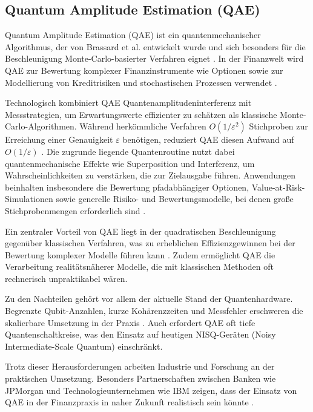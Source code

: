 \subsection{Quantum Amplitude Estimation (QAE)}

Quantum Amplitude Estimation (QAE) ist ein quantenmechanischer Algorithmus, der von Brassard et al. entwickelt wurde und sich besonders für die Beschleunigung Monte-Carlo-basierter Verfahren eignet \cite{quantumjournal2020}. In der Finanzwelt wird QAE zur Bewertung komplexer Finanzinstrumente wie Optionen sowie zur Modellierung von Kreditrisiken und stochastischen Prozessen verwendet \cite{rebentrost2018, egger2020}.

Technologisch kombiniert QAE Quantenamplitudeninterferenz mit Messstrategien, um Erwartungswerte effizienter zu schätzen als klassische Monte-Carlo-Algorithmen. Während herkömmliche Verfahren $O(1/\varepsilon^2)$ Stichproben zur Erreichung einer Genauigkeit $\varepsilon$ benötigen, reduziert QAE diesen Aufwand auf $O(1/\varepsilon)$ \cite{quantumjournal2020, martin2022}. Die zugrunde liegende Quantenroutine nutzt dabei quantenmechanische Effekte wie Superposition und Interferenz, um Wahrscheinlichkeiten zu verstärken, die zur Zielausgabe führen. Anwendungen beinhalten insbesondere die Bewertung pfadabhängiger Optionen, Value-at-Risk-Simulationen sowie generelle Risiko- und Bewertungsmodelle, bei denen große Stichprobenmengen erforderlich sind \cite{orus_quantum_2019, rebentrost2018}.

Ein zentraler Vorteil von QAE liegt in der quadratischen Beschleunigung gegenüber klassischen Verfahren, was zu erheblichen Effizienzgewinnen bei der Bewertung komplexer Modelle führen kann \cite{rebentrost2018}. Zudem ermöglicht QAE die Verarbeitung realitätsnäherer Modelle, die mit klassischen Methoden oft rechnerisch unpraktikabel wären.

Zu den Nachteilen gehört vor allem der aktuelle Stand der Quantenhardware. Begrenzte Qubit-Anzahlen, kurze Kohärenzzeiten und Messfehler erschweren die skalierbare Umsetzung in der Praxis \cite{bouland_prospects_2020, martin2022}. Auch erfordert QAE oft tiefe Quantenschaltkreise, was den Einsatz auf heutigen NISQ-Geräten (Noisy Intermediate-Scale Quantum) einschränkt.

Trotz dieser Herausforderungen arbeiten Industrie und Forschung an der praktischen Umsetzung. Besonders Partnerschaften zwischen Banken wie JPMorgan und Technologieunternehmen wie IBM zeigen, dass der Einsatz von QAE in der Finanzpraxis in naher Zukunft realistisch sein könnte \cite{egger2020}.

